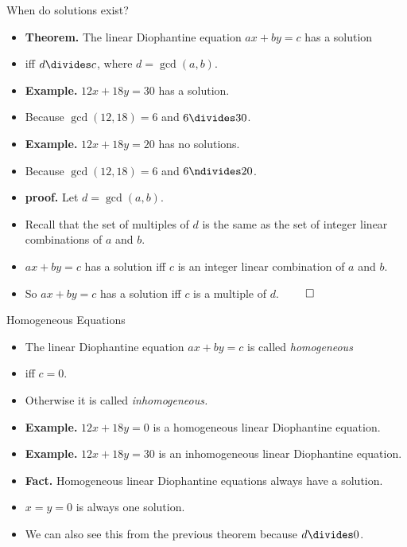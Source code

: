 \documentclass[handout]{beamer}
\begin{document}
\begin{frame}{When do solutions exist?}

\begin{itemize}
  \item \textbf{Theorem.} The linear Diophantine equation $ax+by=c$ has a solution
  \item iff $d\divides c$, where $d=\gcd(a,b)$.
  \item \textbf{Example.} $12x + 18y = 30$ has a solution.
  \item Because $\gcd(12,18) = 6$ and $6\divides 30$.
  \item \textbf{Example.} $12x + 18y = 20$ has no solutions.
  \item Because $\gcd(12,18) = 6$ and $6\ndivides 20$.
  \item \textbf{proof.} Let $d=\gcd(a,b)$.
  \item Recall that the set of multiples of $d$ is the same as the set of
  integer linear combinations of $a$ and $b$.
  \item $ax + by = c$ has a solution iff $c$ is an integer linear combination
  of $a$ and $b$.
  \item So $ax + by = c$ has a solution iff $c$ is a multiple of $d$. $\qed$
\end{itemize}

\end{frame}


\begin{frame}{Homogeneous Equations}

\begin{itemize}
  \item The linear Diophantine equation $ax+by=c$ is called \emph{homogeneous}
  \item iff $c=0$.
  \item Otherwise it is called \emph{inhomogeneous.}
  \item \textbf{Example.} $12x + 18y = 0$ is a homogeneous linear Diophantine equation.
  \item \textbf{Example.} $12x + 18y = 30$ is an inhomogeneous linear Diophantine equation.
  \item \textbf{Fact.} Homogeneous linear Diophantine equations always have a solution.
  \item $x=y=0$ is always one solution.
  \item We can also see this from the previous theorem because $d\divides 0$.
\end{itemize}

\end{frame}
\end{document}
